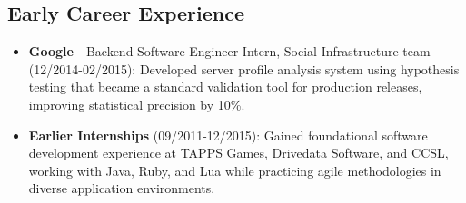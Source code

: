 
\subsection{Early Career Experience}
\begin{itemize}
    \item \small{\textbf{Google} - Backend Software Engineer Intern, Social Infrastructure team (12/2014-02/2015):} \footnotesize{Developed server profile analysis system using hypothesis testing that became a standard validation tool for production releases, improving statistical precision by 10\%.}
    
    \item \small{\textbf{Earlier Internships} (09/2011-12/2015):} \footnotesize{Gained foundational software development experience at TAPPS Games, Drivedata Software, and CCSL, working with Java, Ruby, and Lua while practicing agile methodologies in diverse application environments.}
\end{itemize}